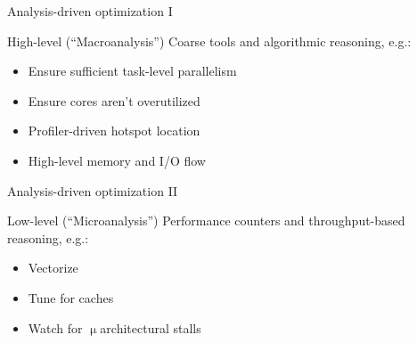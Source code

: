 \documentclass[mathserif,xcolor={dvipsnames,table}]{beamer}
\begin{document}
{
%
\begin{frame}[b]{Analysis-driven optimization I}
\begin{block}{High-level (``Macroanalysis'')}
Coarse tools and algorithmic reasoning, e.g.:
\begin{itemize}
\item Ensure sufficient task-level parallelism
\item Ensure cores aren't overutilized
\item Profiler-driven hotspot location
\item High-level memory and I/O flow
\end{itemize}
\end{block}
\end{frame}
}

{
%
\begin{frame}[b]{Analysis-driven optimization II}
\begin{block}{Low-level (``Microanalysis'')}
Performance counters and throughput-based reasoning, e.g.:
\begin{itemize}
\item Vectorize
\item Tune for caches
\item Watch for $\upmu$architectural stalls
\end{itemize}
\end{block}
\end{frame}
}
\end{document}
